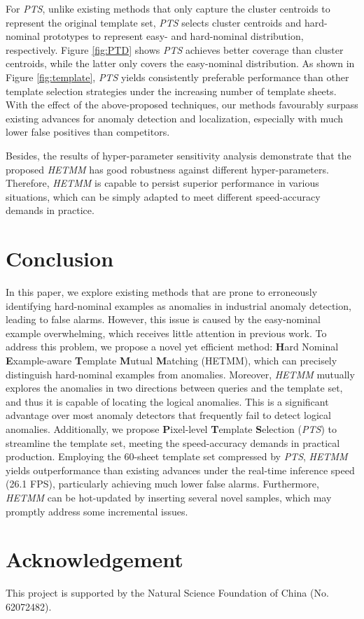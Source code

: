 \documentclass[default,iicol]{sn-jnl}\usepackage[algo2e,ruled,linesnumbered]{algorithm2e}
\theoremstyle{thmstyleone}\newtheorem{theorem}{Theorem}\newtheorem{proposition}[theorem]{Proposition}
\theoremstyle{thmstyletwo}\newtheorem{example}{Example}\newtheorem{remark}{Remark}
\theoremstyle{thmstylethree}\newtheorem{definition}{Definition}
\begin{document}
For \textit{PTS}, unlike existing methods that only capture the cluster centroids to represent the original template set, \textit{PTS} selects cluster centroids and hard-nominal prototypes to represent easy- and hard-nominal distribution, respectively.
Figure \ref{fig:PTD} shows \textit{PTS} achieves better coverage than cluster centroids, while the latter only covers the easy-nominal distribution.
As shown in Figure \ref{fig:template}, \textit{PTS} yields consistently preferable performance than other template selection strategies under the increasing number of template sheets.
With the effect of the above-proposed techniques, our methods favourably surpass existing advances for anomaly detection and localization, especially with much lower false positives than competitors.

Besides, the results of hyper-parameter sensitivity analysis demonstrate that the proposed \textit{HETMM} has good robustness against different hyper-parameters.
Therefore, \textit{HETMM} is capable to persist superior performance in various situations, which can be simply adapted to meet different speed-accuracy demands in practice.

\section{Conclusion}
In this paper, we explore existing methods that are prone to erroneously identifying hard-nominal examples as anomalies in industrial anomaly detection, leading to false alarms.
However, this issue is caused by the easy-nominal example overwhelming, which receives little attention in previous work.
To address this problem, we propose a novel yet efficient method: \textbf{H}ard Nominal \textbf{E}xample-aware \textbf{T}emplate \textbf{M}utual \textbf{M}atching (HETMM), which can precisely distinguish hard-nominal examples from anomalies.
Moreover, \textit{HETMM} mutually explores the anomalies in two directions between queries and the template set, and thus it is capable of locating the logical anomalies.
This is a significant advantage over most anomaly detectors that frequently fail to detect logical anomalies.
Additionally, we propose \textbf{P}ixel-level \textbf{T}emplate \textbf{S}election (\textit{PTS}) to streamline the template set, meeting the speed-accuracy demands in practical production.
Employing the 60-sheet template set compressed by \textit{PTS}, \textit{HETMM} yields outperformance than existing advances under the real-time inference speed (26.1 FPS), particularly achieving much lower false alarms.
Furthermore, \textit{HETMM} can be hot-updated by inserting several novel samples, which may promptly address some incremental issues.

\section*{Acknowledgement}
This project is supported by the Natural Science Foundation of China (No. 62072482).





















\end{document}

